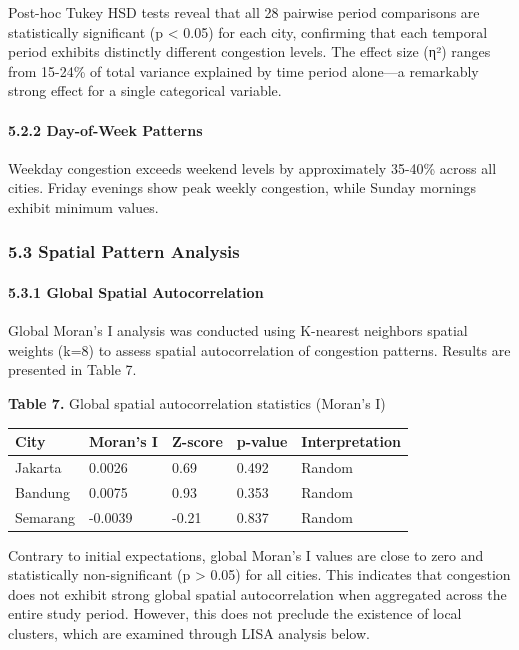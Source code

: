 \documentclass[
  12pt,
]{article}
\begin{document}
Post-hoc Tukey HSD tests reveal that all 28 pairwise period comparisons are statistically significant (p \textless{} 0.05) for each city, confirming that each temporal period exhibits distinctly different congestion levels. The effect size (η²) ranges from 15-24\% of total variance explained by time period alone---a remarkably strong effect for a single categorical variable.

\paragraph{5.2.2 Day-of-Week Patterns}\label{day-of-week-patterns}

Weekday congestion exceeds weekend levels by approximately 35-40\% across all cities. Friday evenings show peak weekly congestion, while Sunday mornings exhibit minimum values.

\subsubsection{5.3 Spatial Pattern Analysis}\label{spatial-pattern-analysis}

\paragraph{5.3.1 Global Spatial Autocorrelation}\label{global-spatial-autocorrelation-1}

Global Moran's I analysis was conducted using K-nearest neighbors spatial weights (k=8) to assess spatial autocorrelation of congestion patterns. Results are presented in Table 7.

\textbf{Table 7.} Global spatial autocorrelation statistics (Moran's I)

\begin{longtable}[]{@{}lllll@{}}
\toprule\noalign{}
City & Moran's I & Z-score & p-value & Interpretation \\
\midrule\noalign{}
\endhead
\bottomrule\noalign{}
\endlastfoot
Jakarta & 0.0026 & 0.69 & 0.492 & Random \\
Bandung & 0.0075 & 0.93 & 0.353 & Random \\
Semarang & -0.0039 & -0.21 & 0.837 & Random \\
\end{longtable}

Contrary to initial expectations, global Moran's I values are close to zero and statistically non-significant (p \textgreater{} 0.05) for all cities. This indicates that congestion does not exhibit strong global spatial autocorrelation when aggregated across the entire study period. However, this does not preclude the existence of local clusters, which are examined through LISA analysis below.
\end{document}
